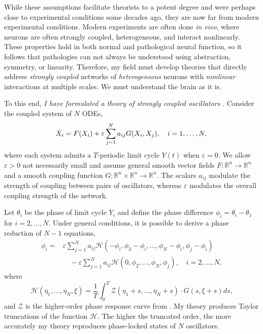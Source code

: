 \documentclass[a4paper,11pt]{article}
\newcommand{\ve}{\varepsilon}
\newcommand{\h}{\mathcal{H}}
\begin{document}
While these assumptions facilitate theorists to a potent degree and were perhaps close to experimental conditions some decades ago, they are now far from modern experimental conditions. Modern experiments are often done \textit{in vivo}, where neurons are often strongly coupled, heterogeneous, and interact nonlinearly. These properties hold in both normal and pathological neural function, so it follows that pathologies can not always be understood using abstraction, symmetry, or linearity. Therefore, my field must develop theories that directly address \textit{strongly coupled} networks of \textit{heterogeneous} neurons with \textit{nonlinear} interactions at multiple scales. We must understand the brain as it is.

To this end, \textit{I have formulated a theory of strongly coupled oscillators} \cite{park2020high}. Consider the coupled system of $N$ ODEs,
\begin{equation}\label{eq:odes}
\dot X_i = F(X_i) +\ve \sum_{j=1}^N a_{ij} G(X_i,X_j), \quad i=1,\ldots,N,\\
\end{equation}
where each system admits a $T$-periodic limit cycle $Y(t)$ when $\ve=0$. We allow $\ve>0$ not necessarily small and assume general smooth vector fields $F:\mathbb{R}^n \rightarrow \mathbb{R}^n$ and a smooth coupling function $G:\mathbb{R}^n\times\mathbb{R}^n\rightarrow \mathbb{R}^n$. The scalars $a_{ij}$ modulate the strength of coupling between pairs of oscillators, whereas $\ve$ modulates the overall coupling strength of the network.

Let $\theta_i$ be the phase of limit cycle $Y_i$ and define the phase difference $\phi_i=\theta_i-\theta_1$ for $i=2,\ldots,N$. Under general conditions, it is possible to derive a phase reduction of $N-1$ equations,
\begin{align*}
\dot \phi_i =& \ve\sum_{j=1}^N a_{ij} \h(-\phi_i,\phi_2-\phi_i,\ldots,\phi_N-\phi_i,\phi_j-\phi_i)\\
&\quad- \ve\sum_{j=1}^N a_{ij} \h(0,\phi_2,\ldots,\phi_N,\phi_j), \quad i=2,\ldots,N,
\end{align*}
where
\begin{equation*}
\h(\eta_1,\ldots,\eta_N,\xi) = \frac{1}{T} \int_0^T \mathcal{Z}(\eta_1+s,\ldots,\eta_N+s) \cdot G(s,\xi+s)ds,
\end{equation*}
and $\mathcal{Z}$ is the higher-order phase response curve from \cite{wilson2020phase}. My theory produces Taylor truncations of the function $\h$. The higher the truncated order, the more accurately my theory reproduces phase-locked states of $N$ oscillators.
\end{document}
